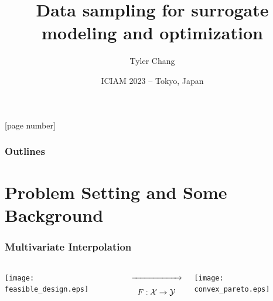 \documentclass[aspectratio=169]{beamer}
\title{Data sampling for surrogate modeling and optimization}
\author{Tyler Chang}
\institute{MCS Division, Argonne National Laboratory}
\date{\small ICIAM 2023 -- Tokyo, Japan}
\begin{document}
{
\frame{\titlepage}
}
[page number]{}

\begin{frame}
  \frametitle{Outlines}
  \tableofcontents
\end{frame}


\section{Problem Setting and Some Background}

\begin{frame}\frametitle{Multivariate Interpolation}
\begin{columns}
\begin{column}{.35\textwidth}
\texttt{[image: feasible\_design.eps]}
\end{column}
\begin{column}{.2\textwidth}
\begin{center}
$\xrightarrow{\hspace*{2cm}}$
$$
F : {\cal X} \rightarrow {\cal Y}
$$
\end{center}
\end{column}
\begin{column}{.35\textwidth}
\texttt{[image: convex\_pareto.eps]}
\end{column}
\end{columns}
\bigskip
\bigskip
\bigskip
\end{frame}
\end{document}
